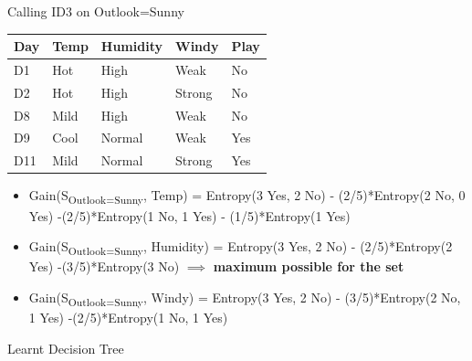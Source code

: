 \documentclass[usenames,dvipsnames]{beamer}
\begin{document}
	\begin{frame}{Calling ID3 on Outlook=Sunny}
\begin{tabular}{llll||l} \toprule
	\textbf{Day} & \textbf{Temp} & \textbf{Humidity} & \textbf{Windy}  & \textbf{Play} \\ \midrule
	D1    & Hot  & High     & Weak   & No   \\
	D2     & Hot  & High     & Strong & No   \\
	D8     & Mild & High     & Weak   & No   \\
	D9    & Cool & Normal   & Weak   & Yes  \\
	D11    & Mild & Normal   & Strong & Yes  \\ \bottomrule
\end{tabular}

\begin{itemize}
	\pause \item Gain(S\textsubscript{Outlook=Sunny}, Temp) = Entropy(3 Yes, 2 No) - (2/5)*Entropy(2 No, 0 Yes) -(2/5)*Entropy(1 No, 1 Yes) - (1/5)*Entropy(1 Yes) 
	\pause \item Gain(S\textsubscript{Outlook=Sunny}, Humidity) = Entropy(3 Yes, 2 No) - (2/5)*Entropy(2 Yes) -(3/5)*Entropy(3 No) $\implies$ \textbf{maximum possible for the set}
	\pause \item Gain(S\textsubscript{Outlook=Sunny}, Windy) = Entropy(3 Yes, 2 No) - (3/5)*Entropy(2 No, 1 Yes) -(2/5)*Entropy(1 No, 1 Yes) 
\end{itemize}
\end{frame}

\begin{frame}{Learnt Decision Tree}

\end{frame}
\end{document}

